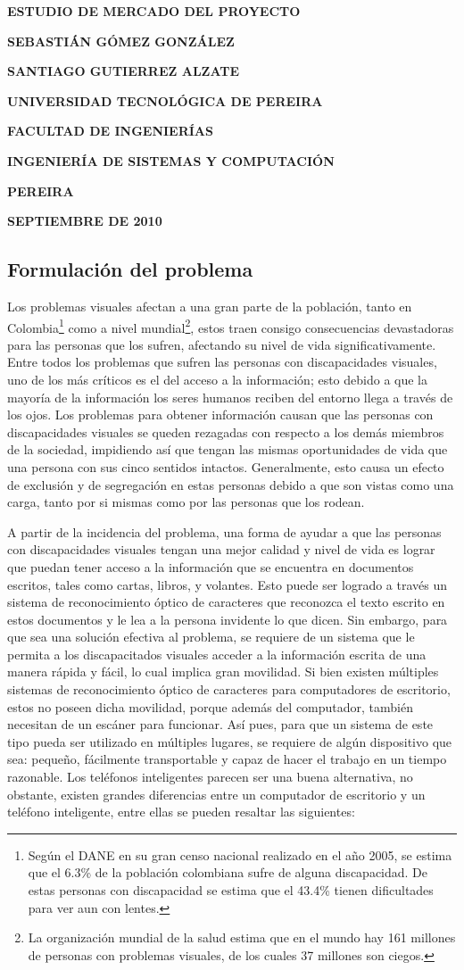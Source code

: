 \documentclass[a4paper, 12pt, oneside]{article}
\newcommand\portada{
	\begin{titlepage}
		\begin{center}
			{\large \bf ESTUDIO DE MERCADO DEL PROYECTO }
			\vfill
			{\large\bf SEBASTIÁN GÓMEZ GONZÁLEZ \par}
			{\large\bf SANTIAGO GUTIERREZ ALZATE \par}
			\vfill
			{\large\bf UNIVERSIDAD TECNOLÓGICA DE PEREIRA  \par}
			{\large\bf FACULTAD DE INGENIERÍAS \par}
			{\large\bf INGENIERÍA DE SISTEMAS Y COMPUTACIÓN \par}
			{\large\bf PEREIRA\par}
			{\large\bf SEPTIEMBRE DE 2010 \par}
		\end{center}
	\end{titlepage}
}
\begin{document}
\portada

	\tableofcontents
	\clearpage
	
	\begin{center}
	\section{Formulación del problema}
	\end{center}

	Los problemas visuales afectan a una gran parte de la población, tanto en Colombia\footnote{Según el DANE en su gran censo nacional realizado en el año 2005, se estima que el 6.3\% de la población colombiana sufre de alguna discapacidad. De estas personas con discapacidad se estima que el 43.4\% tienen dificultades para ver aun con lentes.} como a nivel mundial\footnote{La organización mundial de la salud estima que en el mundo hay 161 millones de personas con problemas visuales, de los cuales 37 millones son ciegos.}, estos traen consigo consecuencias devastadoras para las personas que los sufren, afectando su nivel de vida significativamente. Entre todos los problemas que sufren las personas con discapacidades visuales, uno de los más críticos es el del acceso a la información; esto debido a que la mayoría de la información los seres humanos reciben del entorno llega a través de los ojos. Los problemas para obtener información causan que las personas con discapacidades visuales se queden rezagadas con respecto a los demás miembros de la sociedad, impidiendo así que tengan las mismas oportunidades de vida que una persona con sus cinco sentidos intactos. Generalmente, esto causa un efecto de exclusión y de segregación en estas personas debido a que son vistas como una carga, tanto por si mismas como por las personas que los rodean. 

	A partir de la incidencia del problema, una forma de ayudar a que las personas con discapacidades visuales tengan una mejor calidad y nivel de vida es lograr que puedan tener acceso a la información que se encuentra en documentos escritos, tales como cartas, libros, y volantes. Esto puede ser logrado a través un sistema de reconocimiento óptico de caracteres que reconozca el texto escrito en estos documentos y le lea a la persona invidente lo que dicen. Sin embargo, para que sea una solución efectiva al problema, se requiere de un sistema que le permita a los discapacitados visuales acceder a la información escrita de una manera rápida y fácil, lo cual implica gran movilidad. Si bien existen múltiples sistemas de reconocimiento óptico de caracteres para computadores de escritorio, estos no poseen dicha movilidad, porque además del computador, también necesitan de un escáner para funcionar. Así pues, para que un sistema de este tipo pueda ser utilizado en múltiples lugares, se requiere de algún dispositivo que sea: pequeño, fácilmente transportable y capaz de hacer el trabajo en un tiempo razonable. Los teléfonos inteligentes parecen ser una buena alternativa, no obstante, existen grandes diferencias entre un computador de escritorio y un teléfono inteligente, entre ellas se pueden resaltar las siguientes:
	
\end{document}
